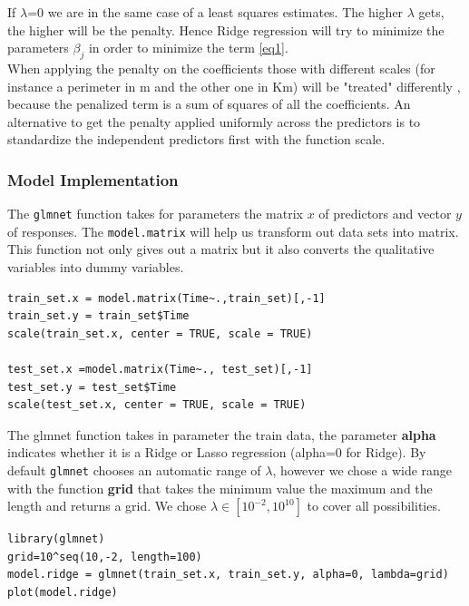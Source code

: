 \documentclass[]{report}
\begin{document}
If $\lambda$=0 we are in the same case of a least squares estimates. The higher $\lambda$ gets, the higher will be the penalty. Hence Ridge regression will try to minimize the parameters $\beta_{j}$ in order to minimize the term \ref{eq1}.\\
When applying the penalty on the coefficients those with different scales (for instance a perimeter in m and the other one in Km) will be "treated" differently , because the penalized term is a sum of squares of all the coefficients. An alternative to get the penalty applied uniformly across the predictors is to standardize the independent predictors first with the function scale.

\subsubsection{Model Implementation}
The \texttt{glmnet} function takes for parameters the matrix $x$ of predictors and vector $y$ of responses. The \texttt{model.matrix} will help us transform out data sets into matrix. This function not only gives out a matrix but it also converts the qualitative variables into dummy variables.
\begin{lstlisting}
train_set.x = model.matrix(Time~.,train_set)[,-1] 
train_set.y = train_set$Time
scale(train_set.x, center = TRUE, scale = TRUE)

test_set.x =model.matrix(Time~., test_set)[,-1]
test_set.y = test_set$Time
scale(test_set.x, center = TRUE, scale = TRUE)
\end{lstlisting}
The glmnet function takes in parameter the train data, the parameter \textbf{alpha} indicates whether it is a Ridge or Lasso regression (alpha=0 for Ridge). By default \texttt{glmnet} chooses an automatic range of $\lambda$, however we chose a wide range with the function \textbf{grid} that takes the minimum value the maximum and the length and returns a grid. We chose $\lambda\in[10^{−2},10^{10}]$ to cover all possibilities.

\begin{lstlisting}
library(glmnet)
grid=10^seq(10,-2, length=100)
model.ridge = glmnet(train_set.x, train_set.y, alpha=0, lambda=grid)
plot(model.ridge)
\end{lstlisting}
\end{document}
